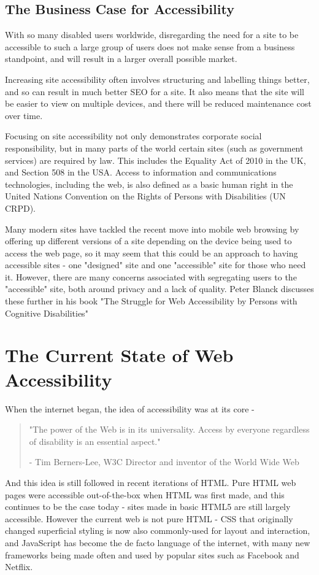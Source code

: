 \documentclass[ %
                    author={Aleena Baig},
                supervisor={Dr Simon Lock},
                    degree={BSc},
                     title={On Making Web Accessible Graphs},
                  subtitle={},
                      year={2019} ]{dissertation}
\begin{document}
\subsection{The Business Case for Accessibility}

With so many disabled users worldwide, disregarding the need for a site to be accessible to such a large group of users does not make sense from a business standpoint, and will result in a larger overall possible market.

Increasing site accessibility often involves structuring and labelling things better, and so can result in much better SEO for a site. It also means that the site will be easier to view on multiple devices, and there will be reduced maintenance cost over time.\cite{WAIaccessibilityintro}

Focusing on site accessibility not only demonstrates corporate social responsibility, but in many parts of the world certain sites (such as government services) are required by law. This includes the Equality Act of 2010 in the UK, and Section 508 in the USA. Access to information and communications technologies, including the web, is also defined as a basic human right in the United Nations Convention on the Rights of Persons with Disabilities (UN CRPD). \cite{accessibilityUN}

Many modern sites have tackled the recent move into mobile web browsing by offering up different versions of a site depending on the device being used to access the web page, so it may seem that this could be an approach to having accessible sites - one "designed" site and one "accessible" site for those who need it. However, there are many concerns associated with segregating users to the "accessible" site, both around privacy and a lack of quality. Peter Blanck discusses these further in his book "The Struggle for Web Accessibility by Persons with Cognitive Disabilities" \cite[p.~157]{strugglewebaccessibility}

\section{The Current State of Web Accessibility}

When the internet began, the idea of accessibility was at its core -

\begin{quote}
\centering
"The power of the Web is in its universality. Access by everyone regardless of disability is an essential aspect."

- Tim Berners-Lee, W3C Director and inventor of the World Wide Web
\end{quote}
%
And this idea is still followed in recent iterations of HTML. Pure HTML web pages were accessible out-of-the-box when HTML was first made, and this continues to be the case today - sites made in basic HTML5 are still largely accessible. However the current web is not pure HTML - CSS that originally changed superficial styling is now also commonly-used for layout and interaction, and JavaScript has become the de facto language of the internet, with many new frameworks being made often and used by popular sites such as Facebook and Netflix.
\end{document}
